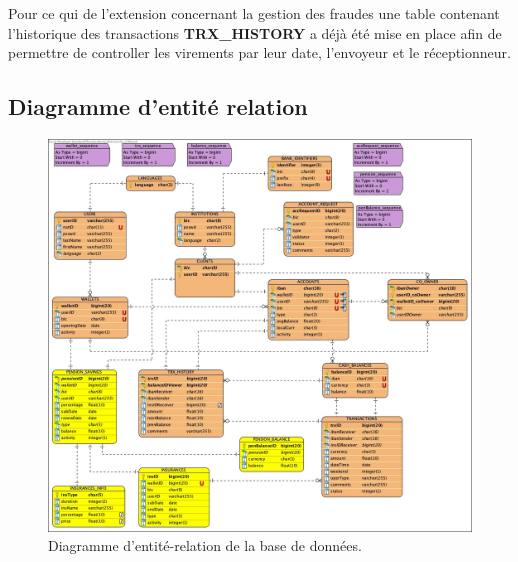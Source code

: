 \documentclass[../rapport.tex]{subfiles}
\begin{document}
	\medskip

	Pour ce qui de l'extension concernant la gestion des fraudes une table contenant l'historique
	des transactions \textbf{TRX\_HISTORY} a déjà été mise en place afin de permettre de controller
	les virements par leur date, l'envoyeur et le réceptionneur. 
	
	
	\newpage
	\subsection{Diagramme d'entité relation}
	
		\begin{figure}[h]
			\centering\includegraphics[scale=0.3]{ressources/finalDb.jpg}
			\caption{Diagramme d'entité-relation de la base de données.}
		\end{figure}
	
\end{document}
